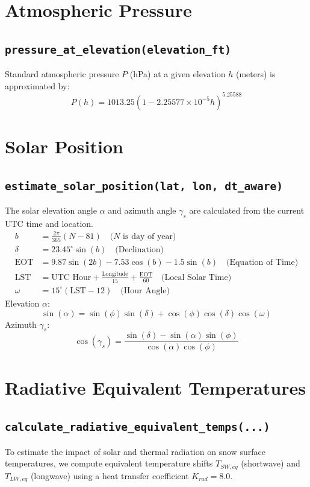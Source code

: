 \documentclass[11pt]{article}
\begin{document}
\section{Atmospheric Pressure}
\subsection{\texttt{pressure\_at\_elevation(elevation\_ft)}}
Standard atmospheric pressure $P$ (hPa) at a given elevation $h$ (meters) is approximated by:
\[
P(h) = 1013.25 \left( 1 - 2.25577 \times 10^{-5} h \right)^{5.25588}
\]

\section{Solar Position}
\subsection{\texttt{estimate\_solar\_position(lat, lon, dt\_aware)}}
The solar elevation angle $\alpha$ and azimuth angle $\gamma_s$ are calculated from the current UTC time and location.
\begin{align*}
b &= \frac{2\pi}{365}(N - 81) \quad \text{($N$ is day of year)} \\
\delta &= 23.45^\circ \sin(b) \quad \text{(Declination)} \\
\text{EOT} &= 9.87 \sin(2b) - 7.53 \cos(b) - 1.5 \sin(b) \quad \text{(Equation of Time)} \\
\text{LST} &= \text{UTC Hour} + \frac{\text{Longitude}}{15} + \frac{\text{EOT}}{60} \quad \text{(Local Solar Time)} \\
\omega &= 15^\circ (\text{LST} - 12) \quad \text{(Hour Angle)}
\end{align*}
Elevation $\alpha$:
\[
\sin(\alpha) = \sin(\phi)\sin(\delta) + \cos(\phi)\cos(\delta)\cos(\omega)
\]
Azimuth $\gamma_s$:
\[
\cos(\gamma_s) = \frac{\sin(\delta) - \sin(\alpha)\sin(\phi)}{\cos(\alpha)\cos(\phi)}
\]

\section{Radiative Equivalent Temperatures}
\subsection{\texttt{calculate\_radiative\_equivalent\_temps(...)}}
To estimate the impact of solar and thermal radiation on snow surface temperatures, we compute equivalent temperature shifts $T_{SW,eq}$ (shortwave) and $T_{LW,eq}$ (longwave) using a heat transfer coefficient $K_{rad} = 8.0$.
\end{document}
